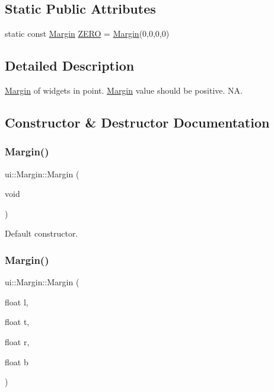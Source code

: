 \subsection*{Static Public Attributes}
\begin{DoxyCompactItemize}
\item 
static const \hyperlink{classui_1_1Margin}{Margin} \hyperlink{classui_1_1Margin_ab3ae697c2669c2289ebd39f10a2eadfd}{Z\+E\+RO} = \hyperlink{classui_1_1Margin}{Margin}(0,0,0,0)
\end{DoxyCompactItemize}


\subsection{Detailed Description}
\hyperlink{classui_1_1Margin}{Margin} of widget\textquotesingle{}s in point. \hyperlink{classui_1_1Margin}{Margin} value should be positive.  NA. 

\subsection{Constructor \& Destructor Documentation}
\mbox{\label{classui_1_1Margin_ac461471a86c6a3c397c0107fa49734d5}} 
\subsubsection{\texorpdfstring{Margin()}{Margin()}\hspace{0.1cm}{\footnotesize\ttfamily [1/6]}}
{\footnotesize\ttfamily ui\+::\+Margin\+::\+Margin (\begin{DoxyParamCaption}\item[{void}]{ }\end{DoxyParamCaption})}

Default constructor. \mbox{\label{classui_1_1Margin_a8174891a0d0fd4234c611446d28f739b}} 
\subsubsection{\texorpdfstring{Margin()}{Margin()}\hspace{0.1cm}{\footnotesize\ttfamily [2/6]}}
{\footnotesize\ttfamily ui\+::\+Margin\+::\+Margin (\begin{DoxyParamCaption}\item[{float}]{l,  }\item[{float}]{t,  }\item[{float}]{r,  }\item[{float}]{b }\end{DoxyParamCaption})}

